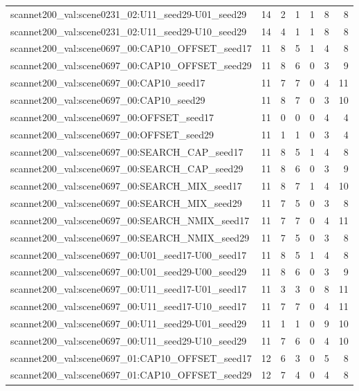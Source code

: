 \begin{table}[t]
\begin{tabular}{lrrrrrr}
scannet200\_val:scene0231\_02:U11\_seed29-U01\_seed29 & 14 & 2 & 1 & 1 & 8 & 8 \\
scannet200\_val:scene0231\_02:U11\_seed29-U10\_seed29 & 14 & 4 & 1 & 1 & 8 & 8 \\
scannet200\_val:scene0697\_00:CAP10\_OFFSET\_seed17 & 11 & 8 & 5 & 1 & 4 & 8 \\
scannet200\_val:scene0697\_00:CAP10\_OFFSET\_seed29 & 11 & 8 & 6 & 0 & 3 & 9 \\
scannet200\_val:scene0697\_00:CAP10\_seed17 & 11 & 7 & 7 & 0 & 4 & 11 \\
scannet200\_val:scene0697\_00:CAP10\_seed29 & 11 & 8 & 7 & 0 & 3 & 10 \\
scannet200\_val:scene0697\_00:OFFSET\_seed17 & 11 & 0 & 0 & 0 & 4 & 4 \\
scannet200\_val:scene0697\_00:OFFSET\_seed29 & 11 & 1 & 1 & 0 & 3 & 4 \\
scannet200\_val:scene0697\_00:SEARCH\_CAP\_seed17 & 11 & 8 & 5 & 1 & 4 & 8 \\
scannet200\_val:scene0697\_00:SEARCH\_CAP\_seed29 & 11 & 8 & 6 & 0 & 3 & 9 \\
scannet200\_val:scene0697\_00:SEARCH\_MIX\_seed17 & 11 & 8 & 7 & 1 & 4 & 10 \\
scannet200\_val:scene0697\_00:SEARCH\_MIX\_seed29 & 11 & 7 & 5 & 0 & 3 & 8 \\
scannet200\_val:scene0697\_00:SEARCH\_NMIX\_seed17 & 11 & 7 & 7 & 0 & 4 & 11 \\
scannet200\_val:scene0697\_00:SEARCH\_NMIX\_seed29 & 11 & 7 & 5 & 0 & 3 & 8 \\
scannet200\_val:scene0697\_00:U01\_seed17-U00\_seed17 & 11 & 8 & 5 & 1 & 4 & 8 \\
scannet200\_val:scene0697\_00:U01\_seed29-U00\_seed29 & 11 & 8 & 6 & 0 & 3 & 9 \\
scannet200\_val:scene0697\_00:U11\_seed17-U01\_seed17 & 11 & 3 & 3 & 0 & 8 & 11 \\
scannet200\_val:scene0697\_00:U11\_seed17-U10\_seed17 & 11 & 7 & 7 & 0 & 4 & 11 \\
scannet200\_val:scene0697\_00:U11\_seed29-U01\_seed29 & 11 & 1 & 1 & 0 & 9 & 10 \\
scannet200\_val:scene0697\_00:U11\_seed29-U10\_seed29 & 11 & 7 & 6 & 0 & 4 & 10 \\
scannet200\_val:scene0697\_01:CAP10\_OFFSET\_seed17 & 12 & 6 & 3 & 0 & 5 & 8 \\
scannet200\_val:scene0697\_01:CAP10\_OFFSET\_seed29 & 12 & 7 & 4 & 0 & 4 & 8 \\

\end{tabular}
\end{table}
